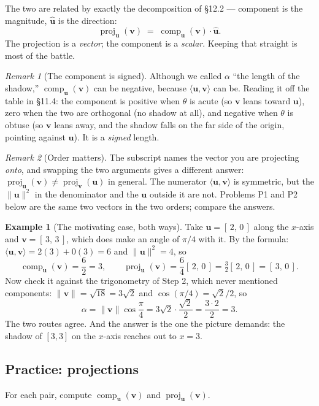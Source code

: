 \documentclass[11pt]{article}
\theoremstyle{definition}
\newtheorem{ex}{Example}[section]
\theoremstyle{remark}
\newtheorem*{rmk}{Remark}
\newcommand{\vc}[1]{\mathbf{#1}}
\newcommand{\norm}[1]{\lVert #1\rVert}
\newcommand{\uv}[1]{\hat{\vc{#1}}}                 %
\newcommand{\proj}[2]{\operatorname{proj}_{#1}(#2)}
\newcommand{\comp}[2]{\operatorname{comp}_{#1}(#2)}
\begin{document}
\noindent The two are related by exactly the decomposition of \S12.2 ---
component is the magnitude, $\uv{u}$ is the direction:
\[
  \proj{\vc{u}}{\vc{v}} \;=\; \comp{\vc{u}}{\vc{v}}\cdot\uv{u} .
\]
The projection is a \emph{vector}; the component is a \emph{scalar}. Keeping
that straight is most of the battle.

\begin{rmk}[The component is signed]
Although we called $\alpha$ ``the length of the shadow,'' $\comp{\vc{u}}{\vc{v}}$
can be negative, because $\langle\vc{u},\vc{v}\rangle$ can be. Reading it off
the table in \S11.4: the component is positive when $\theta$ is acute
(so $\vc{v}$ leans toward $\vc{u}$), zero when the two are orthogonal
(no shadow at all), and negative when $\theta$ is obtuse (so $\vc{v}$ leans
away, and the shadow falls on the far side of the origin, pointing against
$\vc{u}$). It is a \emph{signed} length.
\end{rmk}

\begin{rmk}[Order matters]
The subscript names the vector you are projecting \emph{onto}, and swapping the
two arguments gives a different answer:
$\proj{\vc{u}}{\vc{v}}\neq\proj{\vc{v}}{\vc{u}}$ in general. The numerator
$\langle\vc{u},\vc{v}\rangle$ is symmetric, but the $\norm{\vc{u}}^{2}$ in the
denominator and the $\vc{u}$ outside it are not. Problems P1 and P2 below are
the same two vectors in the two orders; compare the answers.
\end{rmk}

\begin{ex}[The motivating case, both ways]
Take $\vc{u}=[\,2,\,0\,]$ along the $x$-axis and $\vc{v}=[\,3,\,3\,]$, which
does make an angle of $\pi/4$ with it. By the formula:
$\langle\vc{u},\vc{v}\rangle=2(3)+0(3)=6$ and $\norm{\vc{u}}^{2}=4$, so
\[
  \comp{\vc{u}}{\vc{v}}=\frac{6}{2}=3,
  \qquad
  \proj{\vc{u}}{\vc{v}}=\frac{6}{4}[\,2,\,0\,]=\tfrac32[\,2,\,0\,]=[\,3,\,0\,].
\]
Now check it against the trigonometry of Step 2, which never mentioned
components: $\norm{\vc{v}}=\sqrt{18}=3\sqrt2$ and $\cos(\pi/4)=\sqrt2/2$, so
\[
  \alpha=\norm{\vc{v}}\cos\frac{\pi}{4}=3\sqrt2\cdot\frac{\sqrt2}{2}=\frac{3\cdot 2}{2}=3 .
\]
The two routes agree. And the answer is the one the picture demands: the shadow
of $[3,3]$ on the $x$-axis reaches out to $x=3$.
\end{ex}

\subsection{Practice: projections}
For each pair, compute $\comp{\vc{u}}{\vc{v}}$ and $\proj{\vc{u}}{\vc{v}}$.
\end{document}
